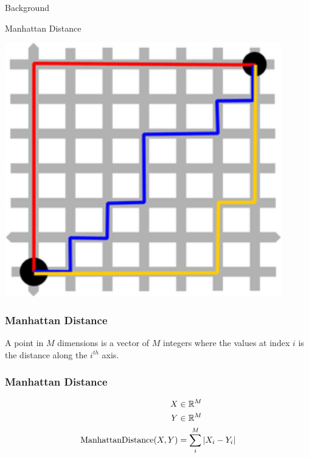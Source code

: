 \documentclass{beamer}
\DeclareMathOperator{\md}{Manhattan Distance}
\begin{document}
\begin{section}{Background}
\begin{subsection}{Manhattan Distance}
\begin{frame}[label=block]
    \begin{center}
        \includegraphics[width=0.9\textwidth]{images/manhattan.png}
    \end{center}
\end{frame}


\begin{frame}
    \frametitle{Manhattan Distance}
        A point in $M$ dimensions is a vector of $M$ integers where the values at index $i$ is the distance along the $i^{th}$ axis.
\end{frame}

\begin{frame}
    \frametitle{Manhattan Distance}
        \begin{align*}
            X &\in \R^{M} \\
            Y &\in \R^{M} \\
            \md(X, Y) &= \sum_i^M | X_i - Y_i |
        \end{align*}
\end{frame}



\end{subsection}
\end{section}
\end{document}
